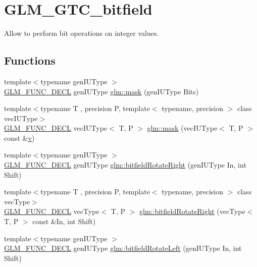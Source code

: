 \hypertarget{group__gtc__bitfield}{}\section{G\+L\+M\+\_\+\+G\+T\+C\+\_\+bitfield}
\label{group__gtc__bitfield}


Allow to perform bit operations on integer values.  


\subsection*{Functions}
\begin{DoxyCompactItemize}
\item 
{\footnotesize template$<$typename gen\+I\+U\+Type $>$ }\\\mbox{\hyperlink{setup_8hpp_ab2d052de21a70539923e9bcbf6e83a51}{G\+L\+M\+\_\+\+F\+U\+N\+C\+\_\+\+D\+E\+CL}} gen\+I\+U\+Type \mbox{\hyperlink{group__gtc__bitfield_gad7eba518a0b71662114571ee76939f8a}{glm\+::mask}} (gen\+I\+U\+Type Bits)
\item 
{\footnotesize template$<$typename T , precision P, template$<$ typename, precision $>$ class vec\+I\+U\+Type$>$ }\\\mbox{\hyperlink{setup_8hpp_ab2d052de21a70539923e9bcbf6e83a51}{G\+L\+M\+\_\+\+F\+U\+N\+C\+\_\+\+D\+E\+CL}} vec\+I\+U\+Type$<$ T, P $>$ \mbox{\hyperlink{group__gtc__bitfield_ga073dbd8642f550b51da3572541431c1c}{glm\+::mask}} (vec\+I\+U\+Type$<$ T, P $>$ const \&\mbox{\hyperlink{glad_8h_a14cfbe2fc2234f5504618905b69d1e06}{v}})
\item 
{\footnotesize template$<$typename gen\+I\+U\+Type $>$ }\\\mbox{\hyperlink{setup_8hpp_ab2d052de21a70539923e9bcbf6e83a51}{G\+L\+M\+\_\+\+F\+U\+N\+C\+\_\+\+D\+E\+CL}} gen\+I\+U\+Type \mbox{\hyperlink{group__gtc__bitfield_ga1c33d075c5fb8bd8dbfd5092bfc851ca}{glm\+::bitfield\+Rotate\+Right}} (gen\+I\+U\+Type In, int Shift)
\item 
{\footnotesize template$<$typename T , precision P, template$<$ typename, precision $>$ class vec\+Type$>$ }\\\mbox{\hyperlink{setup_8hpp_ab2d052de21a70539923e9bcbf6e83a51}{G\+L\+M\+\_\+\+F\+U\+N\+C\+\_\+\+D\+E\+CL}} vec\+Type$<$ T, P $>$ \mbox{\hyperlink{group__gtc__bitfield_ga96b56fd2adad1eeaee9e10dfe83904ba}{glm\+::bitfield\+Rotate\+Right}} (vec\+Type$<$ T, P $>$ const \&In, int Shift)
\item 
{\footnotesize template$<$typename gen\+I\+U\+Type $>$ }\\\mbox{\hyperlink{setup_8hpp_ab2d052de21a70539923e9bcbf6e83a51}{G\+L\+M\+\_\+\+F\+U\+N\+C\+\_\+\+D\+E\+CL}} gen\+I\+U\+Type \mbox{\hyperlink{group__gtc__bitfield_ga2eb49678a344ce1495bdb5586d9896b9}{glm\+::bitfield\+Rotate\+Left}} (gen\+I\+U\+Type In, int Shift)

\end{DoxyCompactItemize}
